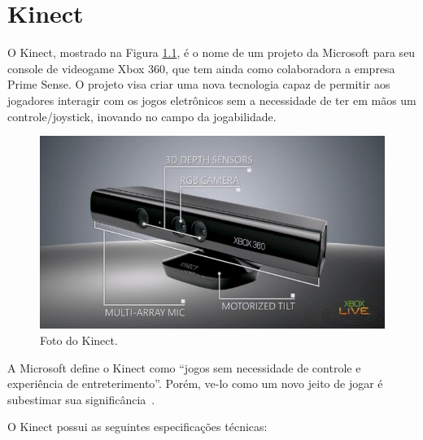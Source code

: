 \chapter{Kinect}

O Kinect, mostrado na Figura \ref{kinect}, é o nome de um projeto da Microsoft para seu console de videogame Xbox 360, que tem ainda como colaboradora a empresa Prime Sense. O projeto visa criar uma nova tecnologia capaz de permitir aos jogadores interagir com os jogos eletrônicos sem a necessidade de ter em mãos um controle/joystick, inovando no campo da jogabilidade.

	\begin{figure}[hbt]
		\begin{center}
			\includegraphics[scale=0.5]{figuras/2.FundamentacaoTeorica/kinect.jpg}
		\end{center}
		\caption{Foto do Kinect.}
		\label{kinect}
	\end{figure}

A Microsoft define o Kinect como ``jogos sem necessidade de controle e experiência de entreterimento''. Porém, ve-lo como um novo jeito de jogar é subestimar sua significância~\cite{kinect}. 

	O Kinect possui as seguintes especificações técnicas:

